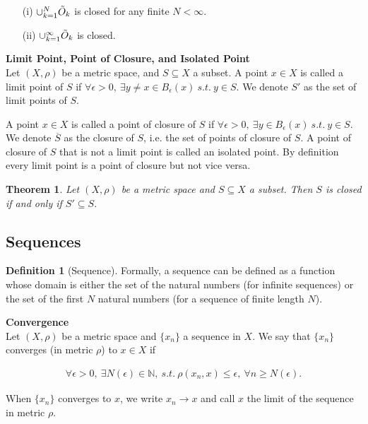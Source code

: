 \documentclass{article}
\newtheorem{theorem}{Theorem}[section]
\numberwithin{theorem}{subsection}
\numberwithin{theorem}{subsubsection}
\numberwithin{lemma}{subsection}
\numberwithin{lemma}{subsubsection}
\theoremstyle{definition}
\newtheorem{definition}{Definition}[section]
\numberwithin{definition}{subsection}
\numberwithin{definition}{subsubsection}
\begin{document}
\begin{itemize}
    \item[(i)] $\cup_{k=1}^{N} \Tilde{O}_{k}$ is closed for any finite $N < \infty$.
    \item[(ii)] $\cup_{k=1}^{\infty} \Tilde{O}_{k}$ is closed.
\end{itemize}

\noindent \textbf{Limit Point, Point of Closure, and Isolated Point} \\
\indent Let $(X,\rho)$ be a metric space, and $S \subseteq X$ a subset. A point $x \in X$ is called a limit point of $S$ if $\forall \epsilon > 0,\ \exists y \neq x \in B_{\epsilon} (x)\ s.t.\ y \in S$. We denote $S'$ as the set of limit points of $S$. \par
A point $x \in X$ is called a point of closure of $S$ if $\forall \epsilon > 0,\ \exists y \in B_{\epsilon}(x)\ s.t.\ y \in S$. We denote $\overline{S}$ as the closure of $S$, i.e. the set of points of closure of $S$. A point of closure of $S$ that is not a limit point is called an isolated point. By definition every limit point is a point of closure but not vice versa.

\begin{theorem}
    Let $(X,\rho)$ be a metric space and $S \subseteq X$ a subset. Then $S$ is closed if and only if $S' \subseteq S$.
\end{theorem}

\subsection{Sequences}
\begin{definition}[Sequence]
    Formally, a sequence can be defined as a function whose domain is either the set of the natural numbers (for infinite sequences) or the set of the first $N$ natural numbers (for a sequence of finite length $N$).
\end{definition}
\noindent \textbf{Convergence}\\
\indent Let $(X,\rho)$ be a metric space and $\{x_{n}\}$ a sequence in $X$. We say that $\{x_{n}\}$ converges (in metric $\rho$) to $x \in X$ if 

\begin{gather*}
    \forall \epsilon > 0,\ \exists N(\epsilon) \in \mathbb{N},\ s.t.\ \rho(x_{n},x) \leq \epsilon,\ \forall n \geq N(\epsilon).
\end{gather*}

\noindent When $\{x_{n}\}$ converges to $x$, we write $x_{n} \rightarrow x$ and call $x$ the limit of the sequence in metric $\rho$.
\\
\end{document}
